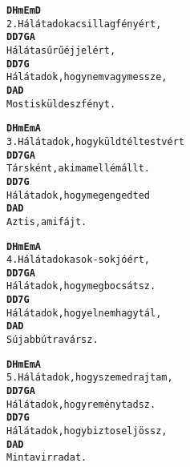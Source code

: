 \begin{minipage}{\textwidth}
\kottastart
{}
\kottaend
\begin{minipage}{\textwidth}
\begin{multicols}{2}
\begin{minipage}{\textwidth}
\begin{alltt}
\textbf{    D    Hm       Em    D}
2. Hálát adok a csillagfényért,
\textbf{    D    D7     G    A}
   Hálát a sűrű éjjelért,
\textbf{    D    D7            G}
   Hálát adok, hogy nem vagy messze,
\textbf{    D       A       D}
   Most is küldesz fényt.
\end{alltt}
\vspace{0.0cm}
\versszakspacing
\end{minipage}
\begin{minipage}{\textwidth}
\begin{alltt}
\textbf{    D    Hm          Em      A}
3. Hálát adok, hogy küldtél testvért
\textbf{    D        D7      G     A}
   Társként, aki ma mellém állt.
\textbf{    D    D7          G}
   Hálát adok, hogy megengedted
\textbf{   D       A    D}
   Azt is, ami fájt.
\end{alltt}
\vspace{0.0cm}
\versszakspacing
\end{minipage}
\begin{minipage}{\textwidth}
\begin{alltt}
\textbf{    D    Hm      Em      A}
4. Hálát adok a sok-sok jóért,
\textbf{    D    D7          G     A}
   Hálát adok, hogy megbocsátsz.
\textbf{    D    D7         G}
   Hálát adok, hogy el nem hagytál,
\textbf{     D     A     D}
   S újabb útra vársz.
\end{alltt}
\vspace{0.0cm}
\versszakspacing
\end{minipage}
\begin{minipage}{\textwidth}
\begin{alltt}
\textbf{    D    Hm           Em    A}
5. Hálát adok, hogy szemed rajtam,
\textbf{    D    D7          G      A}
   Hálát adok, hogy reményt adsz.
\textbf{    D    D7          G}
   Hálát adok, hogy biztos eljössz,
\textbf{    D      A    D}
   Mint a virradat.
\end{alltt}
\vspace{0.0cm}
\versszakspacing
\end{minipage}
\vspace{0.2cm}
\end{multicols}
\end{minipage}

\end{minipage}
~\vspace{1.0cm}
\newline

